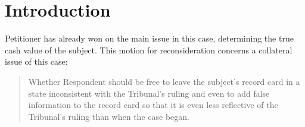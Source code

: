 \documentclass[12pt,\documentclassflag]{michiganCourtOfAppealsBrief}
\begin{document}

  

\section{Introduction}

Petitioner has already won on the main issue in this case, determining the true cash value of the subject. 
This motion for reconsideration concerns a collateral issue of this case:

\begin{quote} Whether Respondent should be free to leave the subject's record card in a state inconsistent with the Tribunal's ruling and even to add false information to the record card so that it is even less reflective of the Tribunal's ruling than when the case began.
\end{quote}
\end{document}
